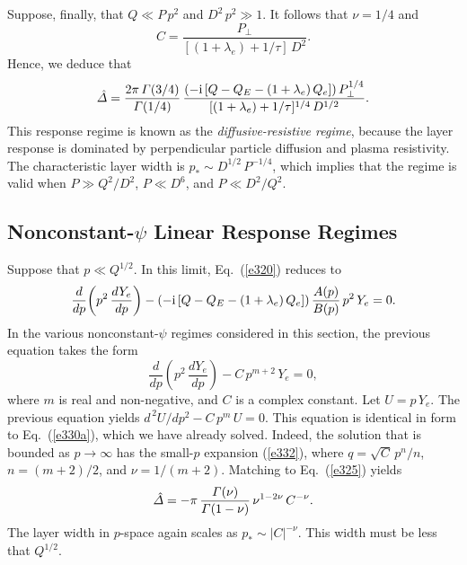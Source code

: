 \documentclass[12pt,prb,aps]{revtex4-1}
\begin{document}
Suppose, finally, that $Q\ll P\,p^2$ and $D^2\,p^2\gg 1$. It follows that $\nu=1/4$ and
\begin{equation}
C = \frac{P_\perp}{[(1+\lambda_e)+1/\tau]\,D^2}.
\end{equation}
Hence, we deduce that 
\begin{equation}\label{hr}
\hat{\mit\Delta}= \frac{2\pi\,{\mit\Gamma}(3/4)}{{\mit\Gamma}(1/4)}\,\frac{(-{\rm i}\,[Q-Q_E-(1+\lambda_e)\,Q_e])\,P_\perp^{1/4}}{[(1+\lambda_e)+1/\tau]^{1/4}\,D^{1/2}}.
\end{equation}
This response regime is known as the {\em diffusive-resistive regime}, because the layer
response is dominated by perpendicular particle diffusion and plasma resistivity. The characteristic
layer width is $p_\ast \sim D^{1/2}\,P^{-1/4}$, which implies that the regime is valid when $P\gg Q^2/D^2$,
$P\ll D^6$, and $P\ll D^2/Q^2$. 

\subsection{Nonconstant-$\psi$ Linear Response Regimes}\label{sncp}
Suppose that $p\ll Q^{1/2}$. In this limit, Eq.~(\ref{e320}) reduces to 
\begin{equation}
\frac{d}{dp}\!\left(p^2\,\frac{dY_e}{dp}\right)-(-{\rm i}\,[Q-Q_E-(1+\lambda_e)\,Q_e])\,\frac{A(p)}{B(p)}\,p^2\,Y_e=0.
\end{equation}
In the various nonconstant-$\psi$ regimes considered in this section, the previous equation takes the form
\begin{equation}
\frac{d}{dp}\!\left(p^2\,\frac{dY_e}{dp}\right)-C\,p^{m+2}\,Y_e = 0,
\end{equation}
where $m$ is real and non-negative, and $C$ is a complex constant. Let $U=p\,Y_e$. The previous equation
yields
$d^{\,2} U/dp^2- C\,p^m\,U = 0$.
This equation is identical in form to Eq.~(\ref{e330a}), which we have already solved. Indeed, the solution that
is bounded as $p\rightarrow\infty$ has the small-$p$ expansion (\ref{e332}), where $q=\sqrt{C}\,p^n/n$, 
$n=(m+2)/2$, and $\nu=1/(m+2)$. Matching to Eq.~(\ref{e325}) yields
\begin{equation}
\hat{\mit\Delta} = -\pi\,\frac{{\mit\Gamma}(\nu)}{{\mit\Gamma}(1-\nu)}\,\nu^{1-2\nu}\,C^{-\nu}.
\end{equation}
The layer width in $p$-space again scales as $p_\ast\sim |C|^{-\nu}$. This width must be
less that $Q^{1/2}$. 
\end{document}
